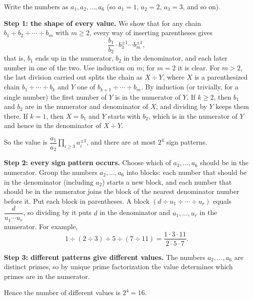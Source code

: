 Write the numbers as $a_1,a_2,\dots,a_{6}$ (so $a_1=1$, $a_2=2$, $a_3=3$, and so on).

\textbf{Step 1: the shape of every value.} We show that for any chain $b_1\div b_2\div\cdots\div b_m$ with $m\ge2$, every way of inserting parentheses gives
\[
\dfrac{b_1}{b_2}\cdot b_3^{\pm1}\cdots b_m^{\pm1},
\]
that is, $b_1$ ends up in the numerator, $b_2$ in the denominator, and each later number in one of the two. Use induction on $m$; for $m=2$ it is clear. For $m>2$, the last division carried out splits the chain as $X\div Y$, where $X$ is a parenthesized chain $b_1\div\cdots\div b_k$ and $Y$ one of $b_{k+1}\div\cdots\div b_m$. By induction (or trivially, for a single number) the first number of $Y$ is in the numerator of $Y$. If $k\ge2$, then $b_1$ and $b_2$ are in the numerator and denominator of $X$, and dividing by $Y$ keeps them there. If $k=1$, then $X=b_1$ and $Y$ starts with $b_2$, which is in the numerator of $Y$ and hence in the denominator of $X\div Y$.

So the value is $\dfrac{a_1}{a_2}\prod_{i\ge3}a_i^{\pm1}$, and there are at most $2^{4}$ sign patterns.

\textbf{Step 2: every sign pattern occurs.} Choose which of $a_3,\dots,a_{6}$ should be in the numerator. Group the numbers $a_2,\dots,a_{6}$ into blocks: each number that should be in the denominator (including $a_2$) starts a new block, and each number that should be in the numerator joins the block of the nearest denominator number before it. Put each block in parentheses. A block $(d\div u_1\div\cdots\div u_r)$ equals $\dfrac{d}{u_1\cdots u_r}$, so dividing by it puts $d$ in the denominator and $u_1,\dots,u_r$ in the numerator. For example,
\[
1\div(2\div3)\div5\div(7\div11)=\dfrac{1\cdot3\cdot11}{2\cdot5\cdot7} .
\]

\textbf{Step 3: different patterns give different values.} The numbers $a_2,\dots,a_{6}$ are distinct primes, so by unique prime factorization the value determines which primes are in the numerator.

Hence the number of different values is $2^{4}=\boxed{16}$.
